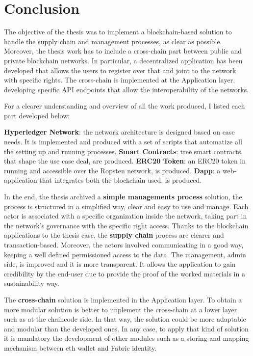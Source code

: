 \chapter{Conclusion}

The objective of the thesis was to implement a blockchain-based solution to handle the supply chain and management processes, 
as clear as possible.
Moreover, the thesis work has to include a cross-chain part between public and private blockchain networks. In particular, 
a decentralized application has been developed that allows the users to register over that and joint to the network with 
specific rights. The cross-chain is implemented at the Application layer, developing specific API endpoints that allow 
the interoperability of the networks.  

For a clearer understanding and overview of all the work produced, I listed each part developed below:

\begin{outline}
    \1 \textbf{Hyperledger Network}: the network architecture is designed based on case needs. It is 
    implemented and produced with a set of scripts that automatize all the setting up and running processes.
    \1 \textbf{Smart Contracts}: tree smart contracts, that shape the use case deal, are produced.
    \1 \textbf{ERC20 Token}: an ERC20 token in running and accessible over the Ropsten network, is produced.
    \1 \textbf{Dapp}: a web-application that integrates both the blockchain used, is produced.
\end{outline}

In the end, the thesis archived a \textbf{simple managements process} solution, the process is structured in a simplified way, clear and 
easy to use and manage. Each actor is associated with a specific organization inside the network, taking part in the network's governance 
with the specific right access. Thanks to the blockchain applications to the thesis case, the \textbf{supply chain} process are clearer and 
transaction-based. Moreover, the actors involved communicating in a good way, keeping a well defined permissioned access to the data. The 
management, admin side, is improved and it is more transparent. 
It allows the application to gain credibility by the end-user due to provide the proof of the worked materials in a 
sustainability way. 
\bigskip

The \textbf{cross-chain} solution is implemented in the Application layer. To obtain a more modular solution is better to implement the 
cross-chain at a lower layer, such as at the chaincode side. In that way, the solution could be more adaptable and modular than the developed 
ones. In any case, to apply that kind of solution it is mandatory the development of other modules such as a storing and mapping mechanism 
between eth wallet and Fabric identity.
\bigskip


